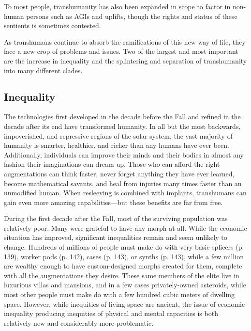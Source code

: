 To most people, transhumanity has also been expanded in scope to factor in non-human persons such 
as AGIs and uplifts, though the rights and status of 
these sentients is sometimes contested.

As transhumans continue to absorb the ramifications of this new way of life, they face a new crop 
of problems and issues. Two of the largest and most 
important are the increase in inequality and the splintering and separation of transhumanity into many 
different clades.

\subsection{Inequality}

The technologies first developed in the decade before 
the Fall and refined in the decade after its end have 
transformed humanity. In all but the most backwards, 
impoverished, and repressive regions of the solar 
system, the vast majority of humanity is smarter, 
healthier, and richer than any humans 
have ever been. Additionally, individuals 
can improve their minds and their bodies 
in almost any fashion their imaginations 
can dream up. Those who can afford the 
right augmentations can think faster, never 
forget anything they have ever learned, 
become mathematical savants, and heal 
from injuries many times faster than an 
unmodified human. When resleeving is 
combined with implants, transhumans can 
gain even more amazing capabilities—but 
these benefits are far from free.

During the first decade after the Fall, 
most of the surviving population was 
relatively poor. Many were grateful to 
have any morph at all. While the economic situation has improved, significant 
inequalities remain and seem unlikely to 
change. Hundreds of millions of people 
must make do with very basic splicers (p. 
139), worker pods (p. 142), cases (p. 143), 
or synths (p. 143), while a few million are 
wealthy enough to have custom-designed 
morphs created for them, complete with 
all the augmentations they desire. These 
same members of the elite live in luxurious villas and mansions, and in a few 
cases privately-owned asteroids, while 
most other people must make do with 
a few hundred cubic meters of dwelling 
space. However, while inequities of living 
space are ancient, the issue of economic 
inequality producing inequities of physical and mental capacities is both relatively 
new and considerably more problematic.


